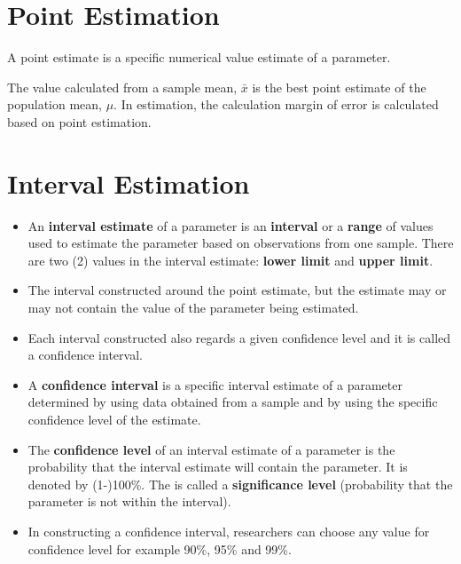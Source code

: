 \documentclass[
  a4paper,
  DIV=11,
  numbers=noendperiod,
  oneside]{scrreprt}
\providecommand{\tightlist}{%
  \setlength{\itemsep}{0pt}\setlength{\parskip}{0pt}}\usepackage{longtable,booktabs,array}
\begin{document}
\hypertarget{point-estimation}{%
\section{Point Estimation}\label{point-estimation}}

A point estimate is a specific numerical value estimate of a parameter.

The value calculated from a sample mean, \(\bar{x}\) is the best point
estimate of the population mean, \(\mu\). In estimation, the calculation
margin of error is calculated based on point estimation.

\hypertarget{interval-estimation}{%
\section{\texorpdfstring{Interval Estimation\\
}{Interval Estimation }}\label{interval-estimation}}

\begin{itemize}
\tightlist
\item
  An \textbf{interval estimate} of a parameter is an \textbf{interval}
  or a \textbf{range} of values used to estimate the parameter based on
  observations from one sample. There are two (2) values in the interval
  estimate: \textbf{lower limit} and \textbf{upper limit}.\\
\item
  The interval constructed around the point estimate, but the estimate
  may or may not contain the value of the parameter being estimated.\\
\item
  Each interval constructed also regards a given confidence level and it
  is called a confidence interval.\\
\item
  A \textbf{confidence interval} is a specific interval estimate of a
  parameter determined by using data obtained from a sample and by using
  the specific confidence level of the estimate.\\
\item
  The \textbf{confidence level} of an interval estimate of a parameter
  is the probability that the interval estimate will contain the
  parameter. It is denoted by (1-)100\%. The is called a
  \textbf{significance level} (probability that the parameter is not
  within the interval).\\
\item
  In constructing a confidence interval, researchers can choose any
  value for confidence level for example 90\%, 95\% and 99\%.\\
\end{itemize}
\end{document}
